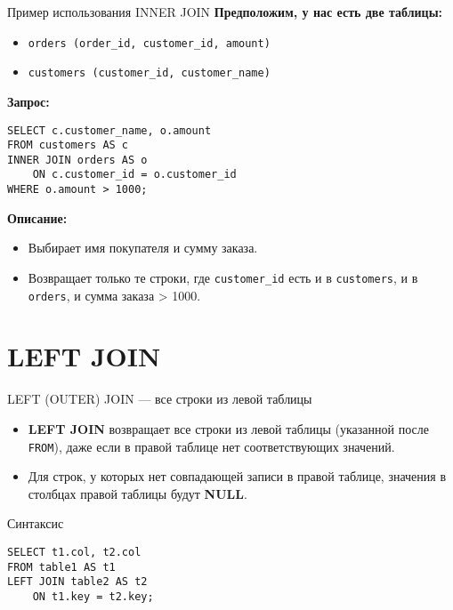\documentclass{beamer}
\begin{document}
\begin{frame}[fragile]{Пример использования INNER JOIN}
	\textbf{Предположим, у нас есть две таблицы:}
	\begin{itemize}
		\item \texttt{orders (order\_id, customer\_id, amount)}
		\item \texttt{customers (customer\_id, customer\_name)}
	\end{itemize}

	\textbf{Запрос:}
	\begin{verbatim}
SELECT c.customer_name, o.amount
FROM customers AS c
INNER JOIN orders AS o
    ON c.customer_id = o.customer_id
WHERE o.amount > 1000;
\end{verbatim}

	\textbf{Описание:}
	\begin{itemize}
		\item Выбирает имя покупателя и сумму заказа.
		\item Возвращает только те строки, где \texttt{customer\_id} есть и в
		      \texttt{customers}, и в \texttt{orders}, и сумма заказа > 1000.
	\end{itemize}
\end{frame}

\section{LEFT JOIN}
\begin{frame}[fragile]{LEFT (OUTER) JOIN — все строки из левой таблицы}
	\begin{itemize}
		\item \textbf{LEFT JOIN} возвращает все строки из левой таблицы (указанной после \texttt{FROM}),
		      даже если в правой таблице нет соответствующих значений.
		\item Для строк, у которых нет совпадающей записи в правой таблице, значения в столбцах правой таблицы будут \textbf{NULL}.
	\end{itemize}
	\begin{block}{Синтаксис}
		\begin{verbatim}
SELECT t1.col, t2.col
FROM table1 AS t1
LEFT JOIN table2 AS t2
    ON t1.key = t2.key;
\end{verbatim}
	\end{block}
\end{frame}
\end{document}
